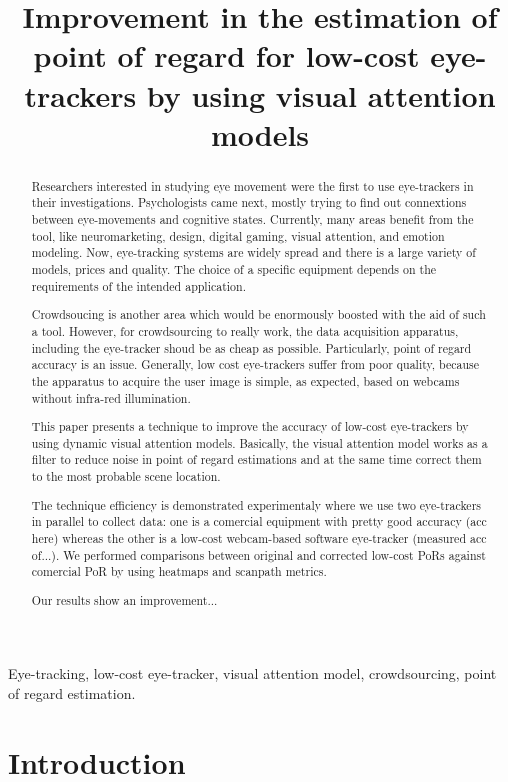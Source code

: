 \documentclass{article}
\title{Improvement in the estimation of point of regard for low-cost eye-trackers by using visual attention models}
\begin{document}
%
\maketitle
%
\begin{abstract}
	Researchers interested in studying eye movement were the first to use eye-trackers in their investigations. Psychologists came next, mostly trying to find out connextions between eye-movements and cognitive states. Currently, many areas benefit from the tool, like neuromarketing, design, digital gaming, visual attention, and emotion modeling. Now, eye-tracking systems are widely spread and there is a large variety of models, prices and quality. The choice of a specific equipment depends on the requirements of the intended application. 

	Crowdsoucing is another area which would be enormously boosted with the aid of such a tool. However, for crowdsourcing to really work, the data acquisition apparatus, including the eye-tracker shoud be as cheap as possible. Particularly, point of regard accuracy is an issue. Generally, low cost eye-trackers suffer from poor quality, because the apparatus to acquire the user image is simple, as expected, based on webcams without infra-red illumination.
	
	This paper presents a technique to improve the accuracy of low-cost eye-trackers by using dynamic visual attention models. Basically, the visual attention model works as a filter to reduce noise in point of regard estimations and at the same time correct them to the most probable scene location.
	
	The technique efficiency is demonstrated experimentaly where we use two eye-trackers in parallel to collect data: one is a comercial equipment with pretty good accuracy (acc here) whereas the other is a low-cost webcam-based software eye-tracker (measured acc of...). We performed comparisons between original and corrected low-cost PoRs against comercial PoR by using heatmaps and scanpath metrics.

	Our results show an improvement... 


\end{abstract}
%
\begin{keywords}
	Eye-tracking, low-cost eye-tracker, visual attention model, crowdsourcing, point of regard estimation.
\end{keywords}
%
\section{Introduction}
\label{sec:intro}
\end{document}
